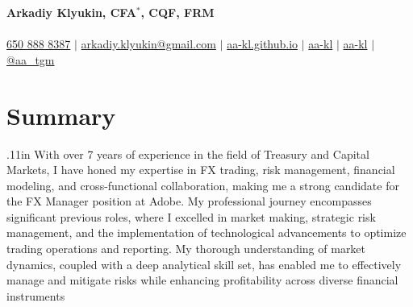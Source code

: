 \documentclass[letterpaper,hidelinks]{article}
\begin{document}
\begin{center}
  \textbf{\Huge{Arkadiy Klyukin, CFA$\mathbb{}^\ast$, CQF, FRM}\\} \\ \vspace{1pt}
  \small
  \faMobile* \hspace{.5pt} \href{tel:+16508888387}{650 888 8387}
  $|$
  \faAt \hspace{.5pt} \href{mailto:arkadiy.klyukin@gmail.com}{arkadiy.klyukin@gmail.com}
  $|$
  \faGlobeAmericas \hspace{.5pt} \href{https://aa-kl.github.io}{aa-kl.github.io}
  $|$
  \faGithub \hspace{.5pt} \href{https://github.com/aa-kl}{aa-kl}
  $|$
  \faLinkedinIn \hspace{.5pt} \href{https://www.linkedin.com/in/aa-kl}{aa-kl}
  $|$
  \faTelegramPlane \hspace{.5pt} \href{https://t.me/aa_tgm}{@aa\_tgm}
\end{center}
\vspace{-27pt}
\section{Summary}
{\hspace{0.1in}
\raggedright{\leftskip.11in
With over 7 years of experience in the field of Treasury and Capital Markets, I have honed my expertise in FX trading, risk management, financial modeling, and cross-functional collaboration, making me a strong candidate for the FX Manager position at Adobe. My professional journey encompasses significant previous roles, where I excelled in market making, strategic risk management, and the implementation of technological advancements to optimize trading operations and reporting. My thorough understanding of market dynamics, coupled with a deep analytical skill set, has enabled me to effectively manage and mitigate risks while enhancing profitability across diverse financial instruments
    \\}
}
\vspace{-8pt}
\end{document}
